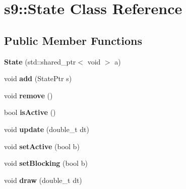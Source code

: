 \hypertarget{classs9_1_1State}{\section{s9\-:\-:\-State \-Class \-Reference}
\label{classs9_1_1State}
}
\subsection*{\-Public \-Member \-Functions}
\begin{DoxyCompactItemize}
\item 
\hypertarget{classs9_1_1State_ae947146d3faa181acc5925975922bb7e}{{\bfseries \-State} (std\-::shared\-\_\-ptr$<$ void $>$ a)}\label{classs9_1_1State_ae947146d3faa181acc5925975922bb7e}

\item 
\hypertarget{classs9_1_1State_a6bc6db5226b1f59ff8d6b6eb008004d4}{void {\bfseries add} (\-State\-Ptr s)}\label{classs9_1_1State_a6bc6db5226b1f59ff8d6b6eb008004d4}

\item 
\hypertarget{classs9_1_1State_a56bb933af67b2188fe5bd0de768f370c}{void {\bfseries remove} ()}\label{classs9_1_1State_a56bb933af67b2188fe5bd0de768f370c}

\item 
\hypertarget{classs9_1_1State_a7d7b695be8a77201673f9978a91b0ede}{bool {\bfseries is\-Active} ()}\label{classs9_1_1State_a7d7b695be8a77201673f9978a91b0ede}

\item 
\hypertarget{classs9_1_1State_a39b6502757d4b906d3fd2a50cac969bf}{void {\bfseries update} (double\-\_\-t dt)}\label{classs9_1_1State_a39b6502757d4b906d3fd2a50cac969bf}

\item 
\hypertarget{classs9_1_1State_a5c98596e2fbbb2efea358ed75df8802e}{void {\bfseries set\-Active} (bool b)}\label{classs9_1_1State_a5c98596e2fbbb2efea358ed75df8802e}

\item 
\hypertarget{classs9_1_1State_a6331830cfd29f7d25282b88d84426a3e}{void {\bfseries set\-Blocking} (bool b)}\label{classs9_1_1State_a6331830cfd29f7d25282b88d84426a3e}

\item 
\hypertarget{classs9_1_1State_a93a43a855a402ea74f90b9badc68c249}{void {\bfseries draw} (double\-\_\-t dt)}\label{classs9_1_1State_a93a43a855a402ea74f90b9badc68c249}

\end{DoxyCompactItemize}
